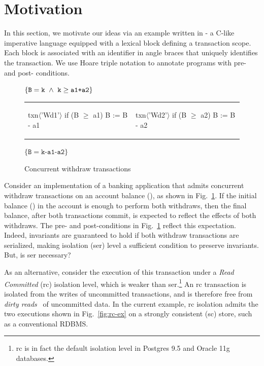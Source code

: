 \section{Motivation}
\label{sec:motivation}

In this section, we motivate our ideas via an example written in
\txnimp - a C-like imperative language equipped with a  lexical
block defining a transaction scope. Each  block is associated
with an identifier in angle braces that uniquely identifies the
transaction. We use Hoare triple notation to annotate programs with
pre- and post- conditions.

\begin{figure}
\centering
$\{\texttt{B}=\texttt{k} ~\wedge~ \texttt{k}\ge\texttt{a1+a2}\}$
\begin{tabular}{l||l}
\begin{txnimpcode}
  txn$\langle$'Wd1'$\rangle${
    if (B $\ge$ a1) {
      B := B - a1
    }
  }
\end{txnimpcode}
&
\begin{txnimpcode}
  txn$\langle$'Wd2'$\rangle${
    if (B $\ge$ a2) {
      B := B - a2
    }
  }
\end{txnimpcode}
\\
\end{tabular}
$\{\texttt{B}=\texttt{k-a1-a2}\}$
\caption{\small Concurrent withdraw transactions}
\label{fig:motiv-eg-1}
\vspace*{-10pt}
\end{figure}

Consider an implementation of a banking application that admits
concurrent withdraw transactions on an account balance (), as
shown in Fig.~\ref{fig:motiv-eg-1}. If the initial balance () in
the account is enough to perform both withdraws, then the final
balance, after both transactions commit, is expected to reflect the
effects of both withdraws. The pre- and post-conditions in
Fig.~\ref{fig:motiv-eg-1} reflect this expectation. Indeed, invariants
are guaranteed to hold if both withdraw transactions are serialized,
making  isolation ({\sc ser}) level a sufficient
condition to preserve invariants. But, is {\sc ser} necessary?

As an alternative, consider the execution of this transaction under a
\emph{Read Committed} ({\sc rc}) isolation level, which is weaker than
{\sc ser}.\footnote{{\sc rc} is in fact the default isolation level in
Postgres 9.5 and Oracle 11g databases.} An {\sc rc} transaction is
isolated from the writes of uncommitted transactions, and is therefore
free from \emph{dirty reads}~\cite{berenson} of uncommitted data. In
the current example, {\sc rc} isolation admits the two executions
shown in Fig.~\ref{fig:rc-ex} on a strongly consistent ({\sc sc})
store, such as a conventional RDBMS.

